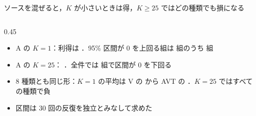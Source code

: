 \begin{frame}{ソースを混ぜると，$K$ が小さいときは得，$K \ge 25$ ではどの種類でも損になる}
\begin{columns}[T,onlytextwidth]
\begin{column}{0.45\textwidth}
      \begin{itemize}\scriptsize\setlength{\itemsep}{6pt}
        \item A の $K=1$：利得は  \pt．95\% 区間が 0 を上回る組は  組のうち  組
        \item A の $K=25$： \pt．全件では  組で区間が 0 を下回る
        \item 8 種類とも同じ形：$K=1$ の平均は V の  から AVT の  \pt．$K=25$ ではすべての種類で負
        \item 区間は 30 回の反復を独立とみなして求めた
      \end{itemize}
    \end{column}
  \end{columns}
\end{frame}

